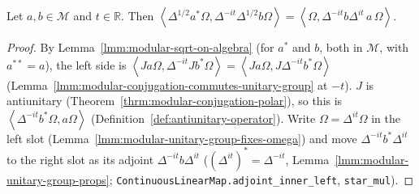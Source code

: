 \begin{lemma}
    \label{lmm:takesaki-upper-boundary-state}
    \leanok
    Let $a, b \in \mathcal{M}$ and $t \in \mathbb{R}$. Then $\left< \Delta^{1/2}a^*\Omega, \Delta^{-it}\Delta^{1/2}b\Omega \right> = \left< \Omega, \Delta^{-it}b\Delta^{it}\,a\,\Omega \right>$.
\end{lemma}
\begin{proof}
    \leanok
    By Lemma~\ref{lmm:modular-sqrt-on-algebra} (for $a^*$ and $b$, both in $\mathcal{M}$, with $a^{**} = a$), the left side is $\left< Ja\Omega, \Delta^{-it}Jb^*\Omega \right> = \left< Ja\Omega, J\Delta^{-it}b^*\Omega \right>$ (Lemma~\ref{lmm:modular-conjugation-commutes-unitary-group} at $-t$). $J$ is antiunitary (Theorem~\ref{thrm:modular-conjugation-polar}), so this is $\left< \Delta^{-it}b^*\Omega, a\Omega \right>$ (Definition~\ref{def:antiunitary-operator}). Write $\Omega = \Delta^{it}\Omega$ in the left slot (Lemma~\ref{lmm:modular-unitary-group-fixes-omega}) and move $\Delta^{-it}b^*\Delta^{it}$ to the right slot as its adjoint $\Delta^{-it}b\Delta^{it}$ ($(\Delta^{it})^* = \Delta^{-it}$, Lemma~\ref{lmm:modular-unitary-group-props}; \texttt{ContinuousLinearMap.adjoint\_inner\_left}, \texttt{star\_mul}).
\end{proof}

